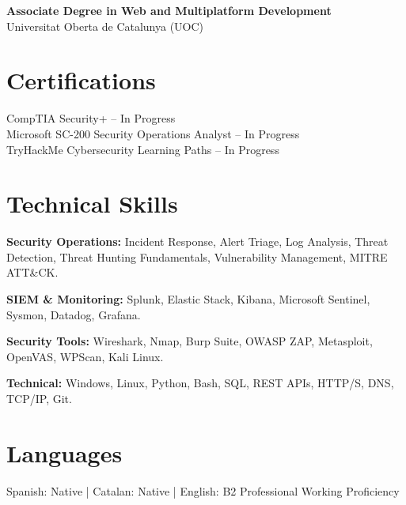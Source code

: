 \documentclass[10pt,a4paper]{article}
\begin{document}
\textbf{Associate Degree in Web and Multiplatform Development}\\
Universitat Oberta de Catalunya (UOC)

\section*{Certifications}
CompTIA Security+ -- In Progress\\
Microsoft SC-200 Security Operations Analyst -- In Progress\\
TryHackMe Cybersecurity Learning Paths -- In Progress

\section*{Technical Skills}
\textbf{Security Operations:} Incident Response, Alert Triage, Log Analysis, Threat Detection, Threat Hunting Fundamentals, Vulnerability Management, MITRE ATT\&CK.

\textbf{SIEM \& Monitoring:} Splunk, Elastic Stack, Kibana, Microsoft Sentinel, Sysmon, Datadog, Grafana.

\textbf{Security Tools:} Wireshark, Nmap, Burp Suite, OWASP ZAP, Metasploit, OpenVAS, WPScan, Kali Linux.

\textbf{Technical:} Windows, Linux, Python, Bash, SQL, REST APIs, HTTP/S, DNS, TCP/IP, Git.

\section*{Languages}
Spanish: Native | Catalan: Native | English: B2 Professional Working Proficiency
\end{document}
